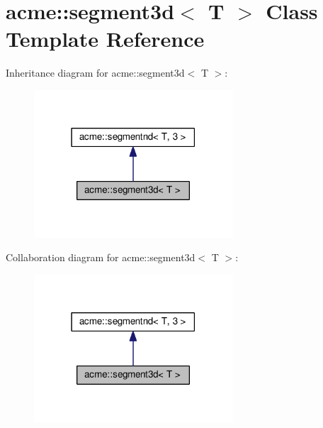 \hypertarget{classacme_1_1segment3d}{}\section{acme\+:\+:segment3d$<$ T $>$ Class Template Reference}
\label{classacme_1_1segment3d}


Inheritance diagram for acme\+:\+:segment3d$<$ T $>$\+:
\nopagebreak
\begin{figure}[H]
\begin{center}
\leavevmode
\includegraphics[width=210pt]{dd/d7f/classacme_1_1segment3d__inherit__graph}
\end{center}
\end{figure}


Collaboration diagram for acme\+:\+:segment3d$<$ T $>$\+:
\nopagebreak
\begin{figure}[H]
\begin{center}
\leavevmode
\includegraphics[width=210pt]{db/d30/classacme_1_1segment3d__coll__graph}
\end{center}
\end{figure}
